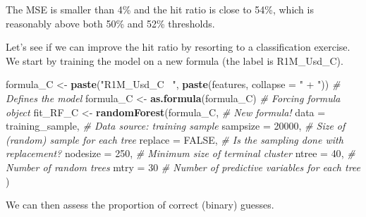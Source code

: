 \documentclass[]{krantz}
\makeatletter
\newenvironment{Shaded}{\begin{snugshade}}{\end{snugshade}}
\newcommand{\CommentTok}[1]{\textcolor[rgb]{0.37,0.37,0.37}{\textit{#1}}}
\newcommand{\DataTypeTok}[1]{\textcolor[rgb]{0.27,0.27,0.27}{#1}}
\newcommand{\DecValTok}[1]{\textcolor[rgb]{0.06,0.06,0.06}{#1}}
\newcommand{\KeywordTok}[1]{\textcolor[rgb]{0.27,0.27,0.27}{\textbf{#1}}}
\newcommand{\NormalTok}[1]{#1}
\newcommand{\OperatorTok}[1]{\textcolor[rgb]{0.43,0.43,0.43}{\textbf{#1}}}
\newcommand{\OtherTok}[1]{\textcolor[rgb]{0.37,0.37,0.37}{#1}}
\newcommand{\StringTok}[1]{\textcolor[rgb]{0.5,0.5,0.5}{#1}}
\newenvironment{kframe}{%
\medskip{}
\setlength{\fboxsep}{.8em}
 \def\at@end@of@kframe{}%
 \ifinner\ifhmode%
  \def\at@end@of@kframe{\end{minipage}}%
  \begin{minipage}{\columnwidth}%
 \fi\fi%
 \def\FrameCommand##1{\hskip\@totalleftmargin \hskip-\fboxsep
 \colorbox{shadecolor}{##1}\hskip-\fboxsep
     \hskip-\linewidth \hskip-\@totalleftmargin \hskip\columnwidth}%
 \MakeFramed {\advance\hsize-\width
   \@totalleftmargin\z@ \linewidth\hsize
   \@setminipage}}%
 {\par\unskip\endMakeFramed%
 \at@end@of@kframe}
\renewenvironment{Shaded}{\begin{kframe}}{\end{kframe}}
\theoremstyle{definition}
\theoremstyle{definition}
\theoremstyle{definition}
\theoremstyle{remark}
\makeatother
\begin{document}
\normalsize

The MSE is smaller than 4\% and the hit ratio is close to 54\%, which is
reasonably above both 50\% and 52\% thresholds.

Let's see if we can improve the hit ratio by resorting to a
classification exercise. We start by training the model on a new formula
(the label is R1M\_Usd\_C).

\footnotesize

\begin{Shaded}
\begin{Highlighting}[]
\NormalTok{formula_C <-}\StringTok{ }\KeywordTok{paste}\NormalTok{(}\StringTok{"R1M_Usd_C ~"}\NormalTok{, }\KeywordTok{paste}\NormalTok{(features, }\DataTypeTok{collapse =} \StringTok{" + "}\NormalTok{)) }\CommentTok{# Defines the model }
\NormalTok{formula_C <-}\StringTok{ }\KeywordTok{as.formula}\NormalTok{(formula_C)                                   }\CommentTok{# Forcing formula object}
\NormalTok{fit_RF_C <-}\StringTok{ }\KeywordTok{randomForest}\NormalTok{(formula_C,         }\CommentTok{# New formula! }
                 \DataTypeTok{data =}\NormalTok{ training_sample,    }\CommentTok{# Data source: training sample}
                 \DataTypeTok{sampsize =} \DecValTok{20000}\NormalTok{,          }\CommentTok{# Size of (random) sample for each tree}
                 \DataTypeTok{replace =} \OtherTok{FALSE}\NormalTok{,           }\CommentTok{# Is the sampling done with replacement?}
                 \DataTypeTok{nodesize =} \DecValTok{250}\NormalTok{,            }\CommentTok{# Minimum size of terminal cluster}
                 \DataTypeTok{ntree =} \DecValTok{40}\NormalTok{,                }\CommentTok{# Number of random trees}
                 \DataTypeTok{mtry =} \DecValTok{30}                  \CommentTok{# Number of predictive variables for each tree }
\NormalTok{    )}
\end{Highlighting}
\end{Shaded}

\normalsize

We can then assess the proportion of correct (binary) guesses.
\footnotesize

\begin{Shaded}
\end{Shaded}
\end{document}
